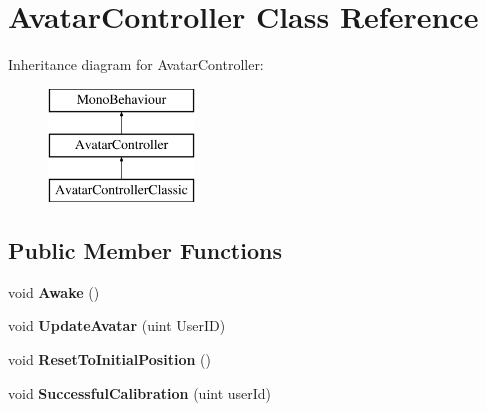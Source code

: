 \hypertarget{class_avatar_controller}{}\section{Avatar\+Controller Class Reference}
\label{class_avatar_controller}
Inheritance diagram for Avatar\+Controller\+:\begin{figure}[H]
\begin{center}
\leavevmode
\includegraphics[height=3.000000cm]{class_avatar_controller}
\end{center}
\end{figure}
\subsection*{Public Member Functions}
\begin{DoxyCompactItemize}
\item 
\mbox{\label{class_avatar_controller_a6fca9255887e52a99fe05978c26e909f}} 
void {\bfseries Awake} ()
\item 
\mbox{\label{class_avatar_controller_ac941da41d7d6f5cf78d8473b660c508a}} 
void {\bfseries Update\+Avatar} (uint User\+ID)
\item 
\mbox{\label{class_avatar_controller_a4b66eff1306b6dd78a9bc1961c21ff05}} 
void {\bfseries Reset\+To\+Initial\+Position} ()
\item 
\mbox{\label{class_avatar_controller_af22254a125eb1a2e1362e0cde161a3a9}} 
void {\bfseries Successful\+Calibration} (uint user\+Id)
\end{DoxyCompactItemize}
